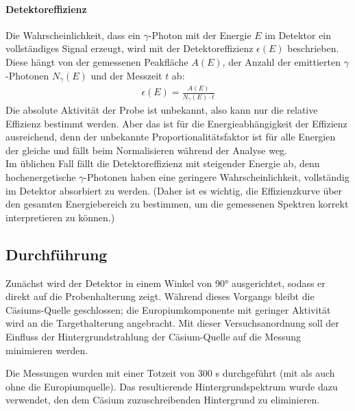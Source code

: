 \paragraph{Detektoreffizienz}
Die Wahrscheinlichkeit, dass ein $\gamma$-Photon mit der Energie $E$ im Detektor ein vollständiges Signal erzeugt, wird mit der Detektoreffizienz $\epsilon(E)$ beschrieben. Diese hängt von der gemessenen Peakfläche $A(E)$, der Anzahl der emittierten $\gamma$-Photonen $N_\gamma(E)$ und der Messzeit $t$ ab:
\begin{align*}  \epsilon(E) = \frac{A(E)}{N_\gamma(E) \cdot t}  \end{align*}
Die absolute Aktivität der Probe ist unbekannt, also kann nur die relative Effizienz bestimmt werden. Aber das ist für die Energieabhängigkeit der Effizienz ausreichend, denn der unbekannte Proportionalitätsfaktor ist für alle Energien der gleiche und fällt beim Normalisieren während der Analyse weg.\\
Im üblichen Fall fällt die Detektoreffizienz mit steigender Energie ab, denn hochenergetische $\gamma$-Photonen haben eine geringere Wahrscheinlichkeit, vollständig im Detektor absorbiert zu werden. (Daher ist es wichtig, die Effizienzkurve über den gesamten Energiebereich zu bestimmen, um die gemessenen Spektren korrekt interpretieren zu können.)
\subsection{Durchführung}
Zunächst wird der Detektor in einem Winkel von 90° ausgerichtet, sodass er direkt auf die Probenhalterung zeigt. Während dieses Vorgangs bleibt die Cäsiums-Quelle geschlossen; die Europiumkomponente mit geringer Aktivität wird an die Targethalterung angebracht. Mit dieser Versuchsanordnung soll der Einfluss der Hintergrundstrahlung der Cäsium-Quelle auf die Messung minimieren werden.

Die Messungen wurden mit einer Totzeit von 300 s durchgeführt (mit als auch ohne die Europiumquelle). Das resultierende Hintergrundspektrum wurde dazu verwendet, den dem Cäsium zuzuschreibenden Hintergrund zu eliminieren.
